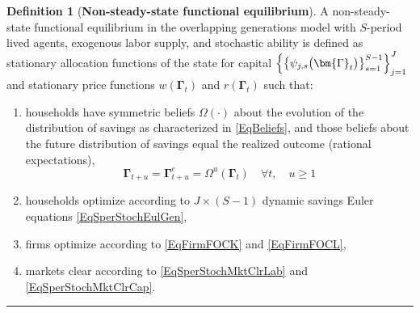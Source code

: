 \documentclass[letterpaper,12pt]{article}
\theoremstyle{definition}
\newtheorem{definition}[theorem]{Definition}
\numberwithin{equation}{section}
\numberwithin{exercise}{section}
\begin{document}
      \begin{definition}[\textbf{Non-steady-state functional equilibrium}]\label{DefSperStochNSSEql}
         A non-steady-state functional equilibrium in the overlapping generations model with $S$-period lived agents, exogenous labor supply, and stochastic ability is defined as stationary allocation functions of the state for capital $\Bigl\{\bigl\{\psi_{j,s}\bigl(\bm{\Gamma}_t\bigr)\bigr\}_{s=1}^{S-1}\Bigr\}_{j=1}^J$ and stationary price functions $w(\bm{\Gamma}_t)$ and $r(\bm{\Gamma}_t)$ such that:
         \begin{enumerate}
            \item households have symmetric beliefs $\Omega(\cdot)$ about the evolution of the distribution of savings as characterized in \eqref{EqBeliefs}, and those beliefs about the future distribution of savings equal the realized outcome (rational expectations),
               \begin{equation*}
                  \bm{\Gamma}_{t+u} = \bm{\Gamma}^e_{t+u} = \Omega^u\left(\bm{\Gamma}_t\right) \quad\forall t,\quad u\geq 1
               \end{equation*}
            \item households optimize according to $J\times(S-1)$ dynamic savings Euler equations \eqref{EqSperStochEulGen},
            \item firms optimize according to \eqref{EqFirmFOCK} and \eqref{EqFirmFOCL},
            \item markets clear according to \eqref{EqSperStochMktClrLab} and \eqref{EqSperStochMktClrCap}.
         \end{enumerate}
      \end{definition}
      \vspace{-2mm}
      \hrule
      \vspace{5mm}
\end{document}
